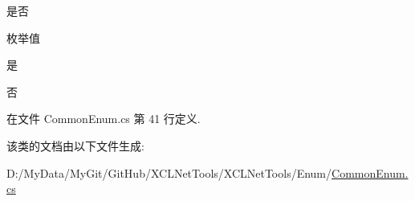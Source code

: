 是否 

\begin{Desc}
\item[枚举值]\par
\begin{description}
\item[{\em 
\hypertarget{class_x_c_l_net_tools_1_1_enum_1_1_common_enum_a5940e298dc09411c8a238f4f4e94e633a0a60ac8f02ccd2cf723f927284877851}{是}\label{class_x_c_l_net_tools_1_1_enum_1_1_common_enum_a5940e298dc09411c8a238f4f4e94e633a0a60ac8f02ccd2cf723f927284877851}
}]是 \item[{\em 
\hypertarget{class_x_c_l_net_tools_1_1_enum_1_1_common_enum_a5940e298dc09411c8a238f4f4e94e633ac9744f45e76d885ae1c74d4f4a934b2e}{否}\label{class_x_c_l_net_tools_1_1_enum_1_1_common_enum_a5940e298dc09411c8a238f4f4e94e633ac9744f45e76d885ae1c74d4f4a934b2e}
}]否 \end{description}
\end{Desc}


在文件 Common\-Enum.\-cs 第 41 行定义.



该类的文档由以下文件生成\-:\begin{DoxyCompactItemize}
\item 
D\-:/\-My\-Data/\-My\-Git/\-Git\-Hub/\-X\-C\-L\-Net\-Tools/\-X\-C\-L\-Net\-Tools/\-Enum/\hyperlink{_common_enum_8cs}{Common\-Enum.\-cs}\end{DoxyCompactItemize}
